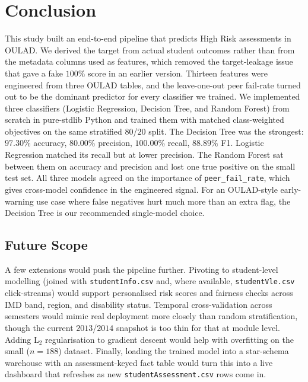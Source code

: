 \documentclass[conference]{IEEEtran}
\begin{document}
\section{Conclusion}
This study built an end-to-end pipeline that predicts High Risk assessments in OULAD. We derived the target from actual student outcomes rather than from the metadata columns used as features, which removed the target-leakage issue that gave a fake $100\%$ score in an earlier version. Thirteen features were engineered from three OULAD tables, and the leave-one-out peer fail-rate turned out to be the dominant predictor for every classifier we trained. We implemented three classifiers (Logistic Regression, Decision Tree, and Random Forest) from scratch in pure-stdlib Python and trained them with matched class-weighted objectives on the same stratified $80$/$20$ split. The Decision Tree was the strongest: $97.30\%$ accuracy, $80.00\%$ precision, $100.00\%$ recall, $88.89\%$ F1. Logistic Regression matched its recall but at lower precision. The Random Forest sat between them on accuracy and precision and lost one true positive on the small test set. All three models agreed on the importance of \texttt{peer\_fail\_rate}, which gives cross-model confidence in the engineered signal. For an OULAD-style early-warning use case where false negatives hurt much more than an extra flag, the Decision Tree is our recommended single-model choice.

\subsection{Future Scope}
A few extensions would push the pipeline further. Pivoting to student-level modelling (joined with \texttt{studentInfo.csv} and, where available, \texttt{studentVle.csv} click-streams) would support personalised risk scores and fairness checks across IMD band, region, and disability status. Temporal cross-validation across semesters would mimic real deployment more closely than random stratification, though the current $2013$/$2014$ snapshot is too thin for that at module level. Adding L$_2$ regularisation to gradient descent would help with overfitting on the small ($n=188$) dataset. Finally, loading the trained model into a star-schema warehouse with an assessment-keyed fact table would turn this into a live dashboard that refreshes as new \texttt{studentAssessment.csv} rows come in.
\end{document}
